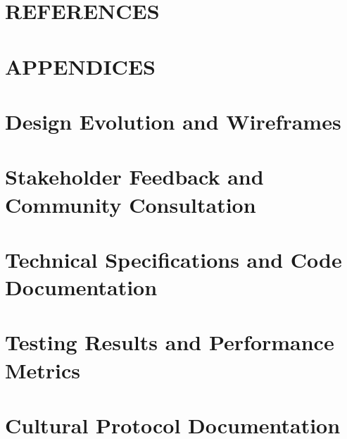 \documentclass[12pt,a4paper]{article}
\begin{document}
\newpage
\section*{REFERENCES}



\newpage
\appendix
\section*{APPENDICES}

\section{Design Evolution and Wireframes}
\label{appendix:design_evolution}


\section{Stakeholder Feedback and Community Consultation}
\label{appendix:stakeholder_feedback}


\section{Technical Specifications and Code Documentation}
\label{appendix:technical_specs}


\section{Testing Results and Performance Metrics}
\label{appendix:testing_results}


\section{Cultural Protocol Documentation}
\label{appendix:cultural_protocols}

\end{document}
